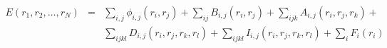 \documentclass[12pt]{article}
\begin{document}
\begin{eqnarray*}
E(r_1,r_2, \ldots ,r_N) & = & \sum_{i,j} \phi_{i,j}(r_i,r_j) + 
                              \sum_{ij} B_{i,j}(r_i,r_j) +
                              \sum_{ijk} A_{i,j}(r_i,r_j,r_k) + \\
                           && \sum_{ijkl} D_{i,j}(r_i,r_j,r_k,r_l) +
                              \sum_{ijkl} I_{i,j}(r_i,r_j,r_k,r_l) +
                              \sum_i F_i(r_i) 
\end{eqnarray*}
\end{document}
